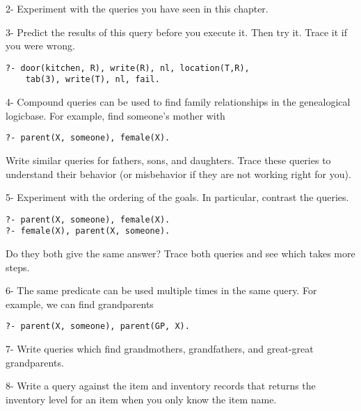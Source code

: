 
2- Experiment with the queries you have seen in this chapter.

3- Predict the results of this query before you execute it. Then try it. Trace
it if you were wrong.
\begin{verbatim}
?- door(kitchen, R), write(R), nl, location(T,R), 
    tab(3), write(T), nl, fail.
\end{verbatim}


4- Compound queries can be used to find family relationships in the genealogical
logicbase. For example, find someone's mother with
\begin{verbatim}
?- parent(X, someone), female(X).
\end{verbatim}
Write similar queries for fathers, sons, and daughters. Trace these queries to
understand their behavior (or misbehavior if they are not working right for
you).

5- Experiment with the ordering of the goals. In particular, contrast the
queries.
\begin{verbatim}
?- parent(X, someone), female(X).
?- female(X), parent(X, someone).
\end{verbatim}
Do they both give the same answer? Trace both queries and see which takes more
steps.

6- The same predicate can be used multiple times in the same query. For example,
we can find grandparents
\begin{verbatim}
?- parent(X, someone), parent(GP, X).
\end{verbatim}
7- Write queries which find grandmothers, grandfathers, and great-great
grandparents.


8- Write a query against the item and inventory records that returns the
inventory level for an item when you only know the item name.

\secup
     
\secup